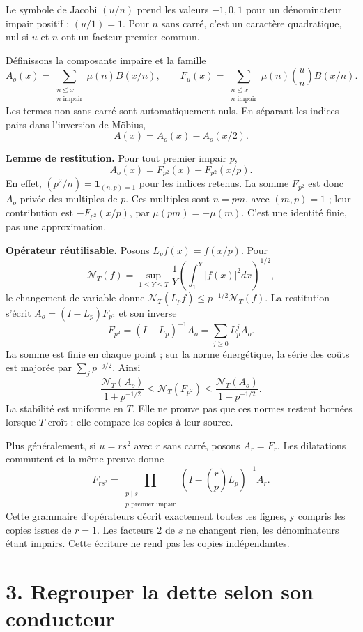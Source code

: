 \documentclass[
  11pt,
  a4paper,
]{article}
\begin{document}
Le symbole de Jacobi \((u/n)\) prend les valeurs \(-1,0,1\) pour un
dénominateur impair positif ; \((u/1)=1\). Pour \(n\) sans carré, c'est
un caractère quadratique, nul si \(u\) et \(n\) ont un facteur premier
commun.

Définissons la composante impaire et la famille \[
A_o(x)=\sum_{\substack{n\le x\\n\text{ impair}}}\mu(n)B(x/n),\qquad
F_u(x)=\sum_{\substack{n\le x\\n\text{ impair}}}
\mu(n)\left(\frac un\right)B(x/n).
\] Les termes non sans carré sont automatiquement nuls. En séparant les
indices pairs dans l'inversion de Möbius, \[
\boxed{A(x)=A_o(x)-A_o(x/2).}
\]

\textbf{Lemme de restitution.} Pour tout premier impair \(p\), \[
\boxed{A_o(x)=F_{p^2}(x)-F_{p^2}(x/p).}
\] En effet, \((p^2/n)=\mathbf1_{(n,p)=1}\) pour les indices retenus. La
somme \(F_{p^2}\) est donc \(A_o\) privée des multiples de \(p\). Ces
multiples sont \(n=pm\), avec \((m,p)=1\) ; leur contribution est
\(-F_{p^2}(x/p)\), par \(\mu(pm)=-\mu(m)\). C'est une identité finie,
pas une approximation.

\textbf{Opérateur réutilisable.} Posons \(L_pf(x)=f(x/p)\). Pour \[
\mathcal N_T(f)=\sup_{1\le Y\le T}
\frac1Y\left(\int_1^Y|f(x)|^2dx\right)^{1/2},
\] le changement de variable donne
\(\mathcal N_T(L_pf)\le p^{-1/2}\mathcal N_T(f)\). La restitution
s'écrit \(A_o=(I-L_p)F_{p^2}\) et son inverse \[
F_{p^2}=(I-L_p)^{-1}A_o=\sum_{j\ge0}L_p^jA_o.
\] La somme est finie en chaque point ; sur la norme énergétique, la
série des coûts est majorée par \(\sum_jp^{-j/2}\). Ainsi \[
\frac{\mathcal N_T(A_o)}{1+p^{-1/2}}
\le\mathcal N_T(F_{p^2})
\le\frac{\mathcal N_T(A_o)}{1-p^{-1/2}}.
\] La stabilité est uniforme en \(T\). Elle ne prouve pas que ces normes
restent bornées lorsque \(T\) croît : elle compare les copies à leur
source.

Plus généralement, si \(u=rs^2\) avec \(r\) sans carré, posons
\(A_r=F_r\). Les dilatations commutent et la même preuve donne \[
F_{rs^2}=\prod_{\substack{p\mid s\\p\text{ premier impair}}}
\left(I-\left(\frac rp\right)L_p\right)^{-1}A_r.
\] Cette grammaire d'opérateurs décrit exactement toutes les lignes, y
compris les copies issues de \(r=1\). Les facteurs 2 de \(s\) ne
changent rien, les dénominateurs étant impairs. Cette écriture ne rend
pas les copies indépendantes.

\newpage

\hypertarget{regrouper-la-dette-selon-son-conducteur}{%
\section{3. Regrouper la dette selon son
conducteur}\label{regrouper-la-dette-selon-son-conducteur}}
\end{document}
